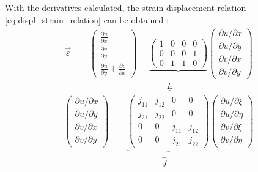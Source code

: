   \noindent With the derivatives calculated, the strain-displacement relation \eqref{eq:displ_strain_relation} can be obtained \cite{cook2002concepts}:
  \begin{align}
  \vec{\varepsilon} &= \begin{pmatrix}
  \frac{\partial u}{\partial x} \\
  \frac{\partial v}{\partial y} \\
  \frac{\partial u}{\partial y} + \frac{\partial v}{\partial x}
  \end{pmatrix} = \underbrace{\begin{pmatrix}
  1&0&0&0\\
  0&0&0&1\\
  0&1&1&0
  \end{pmatrix}} \begin{pmatrix}
  {\partial u}/{\partial x} \\ {\partial u}/{\partial y} \\ {\partial v}/{\partial x} \\ {\partial v}/{\partial y}
  \end{pmatrix} \\
  &\qquad\qquad\qquad\qquad\qquad\,\: \underline{L} \nonumber
  \end{align}
  \begin{align}
  \begin{pmatrix}
  {\partial u}/{\partial x} \\ {\partial u}/{\partial y} \\ {\partial v}/{\partial x} \\ {\partial v}/{\partial y}
  \end{pmatrix} &= \underbrace{\begin{pmatrix}
  j_{11} & j_{12} & 0 & 0\\
  j_{21} & j_{22} & 0 & 0\\
  0 & 0 & j_{11} & j_{12}\\
  0 & 0 & j_{21} & j_{22}
  \end{pmatrix}} \begin{pmatrix}
  {\partial u}/{\partial \xi} \\ {\partial u}/{\partial \eta} \\ {\partial v}/{\partial \xi} \\ {\partial v}/{\partial \eta}
  \end{pmatrix}\\
  &\qquad\qquad\quad\,\: \underline{\hat{J}} \nonumber
  \end{align}
